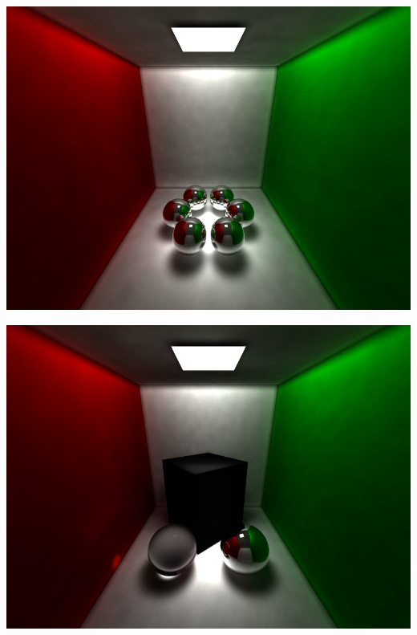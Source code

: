 \documentclass[a4paper]{article}
\begin{document}
\begin{center}
	\includegraphics[scale=0.43]{images/gallery/balls.png}
	\label{fig:balls}
\end{center}

\begin{center}
	\includegraphics[scale=0.43]{images/gallery/mixed.png}
	\label{fig:mixed}
\end{center}
\end{document}

